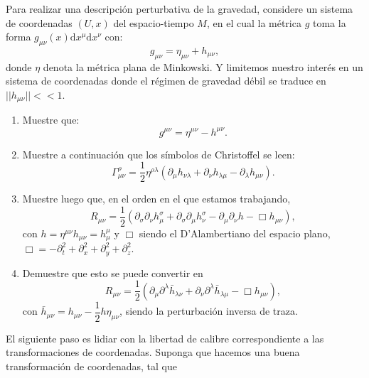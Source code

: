 \documentclass[../main]{subfiles}
\begin{document}
\begin{enumerate}
    Para realizar una descripción perturbativa de la gravedad, considere un sistema de coordenadas $(U, x)$ del espacio-tiempo $M$, en el cual la métrica $g$ toma la forma $g_{\mu\nu}(x)\mathrm{d}x^{\mu}\mathrm{d}x^{\nu}$ con:
    \begin{equation}
        g_{\mu\nu}=\eta_{\mu\nu}+h_{\mu\nu},
    \end{equation}
    donde $\eta$ denota la métrica plana de Minkowski. Y limitemos nuestro interés en un sistema de coordenadas donde el régimen de gravedad débil se traduce en $||h_{\mu\nu}||<<1$.
    \begin{enumerate}[label=(\alph*)]
        \item Muestre que: 
        \begin{equation}
            g^{\mu\nu}=\eta^{\mu\nu}-h^{\mu\nu}.
        \end{equation}
        \item Muestre a continuación que los símbolos de Christoffel se leen:
        \begin{equation}
            \Gamma^{\rho}_{\mu\nu}=\dfrac{1}{2}\eta^{\rho\lambda}(\partial_{\mu} h_{\nu\lambda}+\partial_{\nu}h_{\lambda\mu}-\partial_{\lambda}h_{\mu\nu}).
        \end{equation}
        \item Muestre luego que, en el orden en el que estamos trabajando,
        \begin{equation}
            R_{\mu\nu}=\dfrac{1}{2}(\partial_{\sigma}\partial_{\nu}h^{\sigma}_{\mu}+\partial_{\sigma}\partial_{\mu}h^{\sigma}_{\nu}-\partial_{\mu}\partial_{\nu}h-\Box h_{\mu\nu}),
        \end{equation}
        con $h=\eta^{\mu\nu} h_{\mu\nu}=h^{\mu}_{\mu}$ y $\Box$ siendo el D'Alambertiano del espacio plano, $\Box=-\partial^2_t+\partial^2_x+\partial^2_y+\partial^2_z$.
        \item Demuestre que esto se puede convertir en 
        \begin{equation}
            R_{\mu\nu}=\dfrac{1}{2}(\partial_{\mu}\partial^{\lambda}\bar{h}_{\lambda\nu}+\partial_{\nu}\partial^{\lambda}\bar{h}_{\lambda\mu}-\Box h_{\mu\nu}),
        \end{equation}
        con $\bar{h}_{\mu\nu}=h_{\mu\nu}-\dfrac{1}{2}h \eta_{\mu\nu}$, siendo la perturbación inversa de traza.
    \end{enumerate}
    El siguiente paso es lidiar con la libertad de calibre correspondiente a las transformaciones de coordenadas. Suponga que hacemos una buena transformación de coordenadas, tal que 

\end{enumerate}
\end{document}
